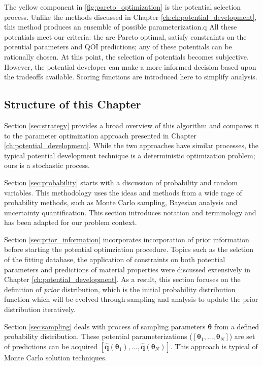 The yellow component in \ref{fig:pareto_optimization} is the potential selection process.  Unlike the methods discussed in Chapter \ref{ch:ch:potential_development}, this method produces an ensemble of possible parameterization.q  All these potentials meet our criteria: the are Pareto optimal, satisfy constraints on the potential parameters and QOI predictions; any of these potentials can be rationally chosen.  At this point, the selection of potentials becomes subjective.  However, the potential developer can make a more informed decision based upon the tradeoffs available.  Scoring functions are introduced here to simplify analysis.

\subsection{Structure of this Chapter}

Section \ref{sec:strategy} provides a broad overview of this algorithm and compares it to the parameter optimization approach presented in Chapter \ref{ch:potential_development}.  While the two approaches have similar processes, the typical potential development technique is a deterministic optimization problem; ours is a stochastic process.

Section \ref{sec:probability} starts with a discussion of probability and random variables.  This methodology uses the ideas and methods from a wide rage of probability methods, such as Monte Carlo sampling, Bayesian analysis and uncertainty quantification.  This section introduces notation and terminology and has been adapted for our problem context.

Section \ref{sec:prior_information} incorporates incorporation of prior information before starting the potential optimziation procedure.  Topics such as the selction of the fitting database, the application of constraints on both potential parameters and predictions of material properties were discussed extensively in Chapter \ref{ch:potential_development}.  As a result, this section focuses on the definition of \emph{prior} distribution, which is the initial probability distribution function which will be evolved through sampling and analysis to update the prior distribution iteratively.

Section \ref{sec:sampling} deals with process of sampling parameters $\bm{\theta}$ from a defined probability distribution.  These potential parameterizations ($[\bm{\theta}_1,...,\bm{\theta}_N]$) are set of predictions can be acquired $[\hat{\bm{q}}(\bm{\theta}_1),...,\hat{\bm{q}}(\bm{\theta}_N)]$. This approach is typical of Monte Carlo solution techniques.

